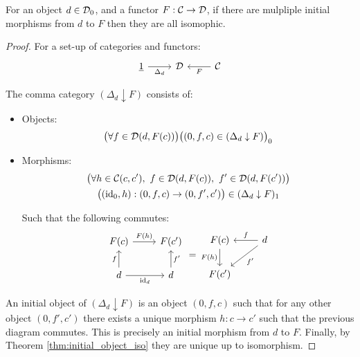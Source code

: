 \begin{theorem}
	For an object $d\in \mathcal{D}_0$, and a functor $F:\mathcal{C}\to \mathcal{D}$, if there are mulpliple
	initial morphisms from $d$ to $F$ then they are all isomophic.

	\begin{proof}
		For a set-up of categories and functors:
		\[\begin{tikzcd}[ampersand replacement=\&]
			{\underline{1}} \& \D \& \C
			\arrow["F", from=1-3, to=1-2]
			\arrow["{\Delta_d}"', from=1-1, to=1-2]
		\end{tikzcd}\]

		The comma category $(\Delta_d\downarrow F)$ consists of:
		\begin{itemize}
			\item Objects:
				\[\big(\forall f\in \mathcal{D}(d, F(c))\big)
					\big((0,f,c)\in(\Delta_d\downarrow F)\big)_0\]
			\item Morphisms:
				\[
					\begin{gathered}
						\big(\forall h\in \mathcal{C}(c, c')
							,\ f\in \mathcal{D}(d, F(c)),\ f'\in \mathcal{D}(d, F(c'))\big)\\
						\big((\mathrm{id}_0, h): (0, f, c) \to (0, f', c')\big)
						\in(\Delta_d\downarrow F)_1
					\end{gathered}
				\]

				Such that the following commutes:
				\[\begin{tikzcd}
					{F(c)} & {F(c')} \\
					d & d
					\arrow["{F(h)}", from=1-1, to=1-2]
					\arrow["{\mathrm{id}_d}"', from=2-1, to=2-2]
					\arrow["f", from=2-1, to=1-1]
					\arrow["{f'}"', from=2-2, to=1-2]
				\end{tikzcd}
				=
				\begin{tikzcd}
					{F(c)} & d \\
					{F(c')}
					\arrow["{F(h)}"', from=1-1, to=2-1]
					\arrow["{f'}", from=1-2, to=2-1]
					\arrow["f"', from=1-2, to=1-1]
				\end{tikzcd}\]
		\end{itemize}
		An initial object of $(\Delta_d\downarrow F)$ is an object $(0,f,c)$ such
		that for any other object $(0, f', c')$ there exists a unique morphism $h:c
		\to c'$ such that the previous diagram commutes. This is precisely an
		initial morphism from $d$ to $F$. Finally, by Theorem
		\ref{thm:initial_object_iso} they are unique up to isomorphism.
	\end{proof}
\end{theorem}

